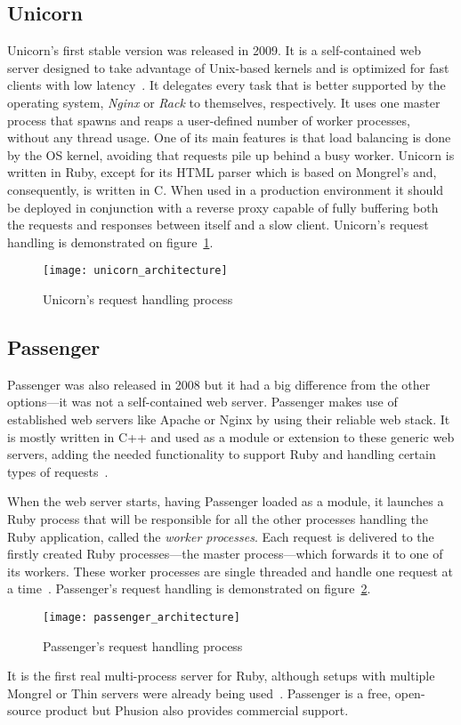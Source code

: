 \subsection{Unicorn}
Unicorn's first stable version was released in 2009. It is a self-contained web server designed to take advantage of Unix-based kernels and is optimized for fast clients with low latency~\cite{unicorn}. It delegates every task that is better supported by the operating system, \textit{Nginx} or \textit{Rack} to themselves, respectively. It uses one master process that spawns and reaps a user-defined number of worker processes, without any thread usage. One of its main features is that load balancing is done by the OS kernel, avoiding that requests pile up behind a busy worker. Unicorn is written in Ruby, except for its HTML parser which is based on Mongrel's and, consequently, is written in C. When used in a production environment it should be deployed in conjunction with a reverse proxy capable of fully buffering both the requests and responses between itself and a slow client.
Unicorn's request handling is demonstrated on figure~\ref{fig:unicorn_architecture}.
\begin{figure}[h]
  \centering
    \texttt{[image: unicorn\_architecture]}
  \caption{Unicorn's request handling process}
  \label{fig:unicorn_architecture}
\end{figure}


\subsection{Passenger}
Passenger was also released in 2008 but it had a big difference from the other options---it was not a self-contained web server. Passenger makes use of established web servers like Apache or Nginx by using their reliable web stack. It is mostly written in C++ and used as a module or extension to these generic web servers, adding the needed functionality to support Ruby and handling certain types of requests~\cite{passenger_whatis}.

When the web server starts, having Passenger loaded as a module, it launches a Ruby process that will be responsible for all the other processes handling the Ruby application, called the \textit{worker processes}. Each request is delivered to the firstly created Ruby processes---the master process---which forwards it to one of its workers. These worker processes are single threaded and handle one request at a time~\cite{ruby_webservers}. Passenger's request handling is demonstrated on figure~\ref{fig:passenger_architecture}.
\begin{figure}[h]
  \centering
    \texttt{[image: passenger\_architecture]}
  \caption{Passenger's request handling process}
  \label{fig:passenger_architecture}
\end{figure}
It is the first real multi-process server for Ruby, although setups with multiple Mongrel or Thin servers were already being used~\cite{passenger_whatis}. Passenger is a free, open-source product but Phusion also provides commercial support.


